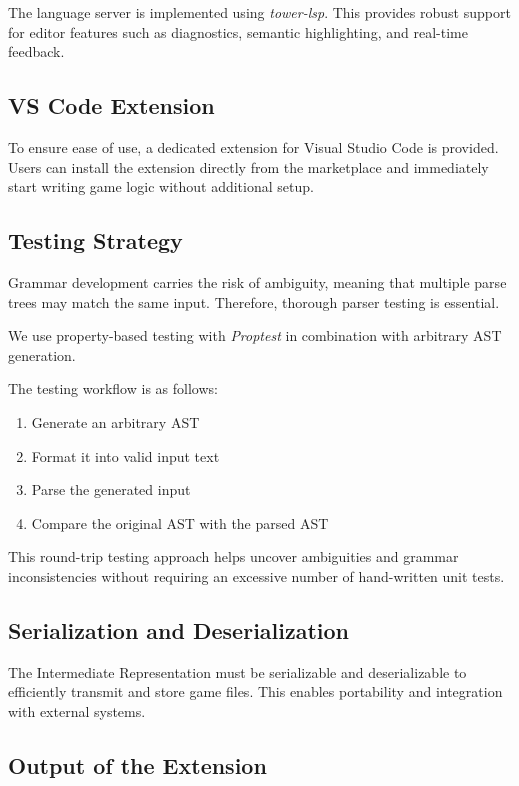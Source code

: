 \documentclass[a4paper,11pt]{article}
\begin{document}
The language server is implemented using \textit{tower-lsp}. This provides robust support for editor features such as diagnostics, semantic highlighting, and real-time feedback.

\subsection{VS Code Extension}

To ensure ease of use, a dedicated extension for Visual Studio Code is provided. Users can install the extension directly from the marketplace and immediately start writing game logic without additional setup.

\subsection{Testing Strategy}

Grammar development carries the risk of ambiguity, meaning that multiple parse trees may match the same input. Therefore, thorough parser testing is essential.

We use property-based testing with \textit{Proptest} in combination with arbitrary AST generation.

The testing workflow is as follows:
\begin{enumerate}
    \item Generate an arbitrary AST
    \item Format it into valid input text
    \item Parse the generated input
    \item Compare the original AST with the parsed AST
\end{enumerate}

This round-trip testing approach helps uncover ambiguities and grammar inconsistencies without requiring an excessive number of hand-written unit tests.

\subsection{Serialization and Deserialization}

The Intermediate Representation must be serializable and deserializable to efficiently transmit and store game files. This enables portability and integration with external systems.

\subsection{Output of the Extension}
\end{document}
